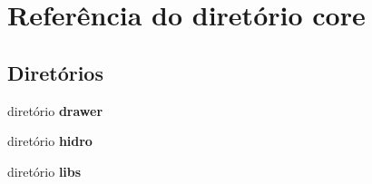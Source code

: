 \section{Referência do diretório core}
\label{dir_a4da031be8de47084054400eff6e3a4e}
\subsection*{Diretórios}
\begin{DoxyCompactItemize}
\item 
diretório {\bf drawer}
\item 
diretório {\bf hidro}
\item 
diretório {\bf libs}
\end{DoxyCompactItemize}
